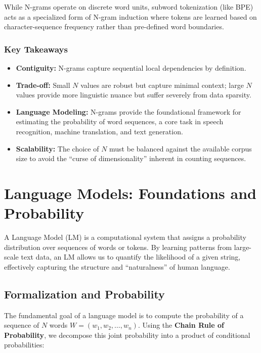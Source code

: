 \documentclass[
  italian,
  11pt,
]{article}
\providecommand{\tightlist}{%
  \setlength{\itemsep}{0pt}\setlength{\parskip}{0pt}}
\begin{document}
While N-grams operate on discrete word units, subword tokenization (like
BPE) acts as a specialized form of N-gram induction where tokens are
learned based on character-sequence frequency rather than pre-defined
word boundaries.

\subsubsection{Key Takeaways}\label{key-takeaways-5}

\begin{itemize}
\tightlist
\item
  \textbf{Contiguity:} N-grams capture sequential local dependencies by
  definition.
\item
  \textbf{Trade-off:} Small \(N\) values are robust but capture minimal
  context; large \(N\) values provide more linguistic nuance but suffer
  severely from data sparsity.
\item
  \textbf{Language Modeling:} N-grams provide the foundational framework
  for estimating the probability of word sequences, a core task in
  speech recognition, machine translation, and text generation.
\item
  \textbf{Scalability:} The choice of \(N\) must be balanced against the
  available corpus size to avoid the ``curse of dimensionality''
  inherent in counting sequences.
\end{itemize}

\newpage

\section{Language Models: Foundations and
Probability}\label{language-models-foundations-and-probability}

A Language Model (LM) is a computational system that assigns a
probability distribution over sequences of words or tokens. By learning
patterns from large-scale text data, an LM allows us to quantify the
likelihood of a given string, effectively capturing the structure and
``naturalness'' of human language.

\subsection{Formalization and
Probability}\label{formalization-and-probability}

The fundamental goal of a language model is to compute the probability
of a sequence of \(N\) words \(W = (w_1, w_2, \dots, w_n)\). Using the
\textbf{Chain Rule of Probability}, we decompose this joint probability
into a product of conditional probabilities:
\end{document}
